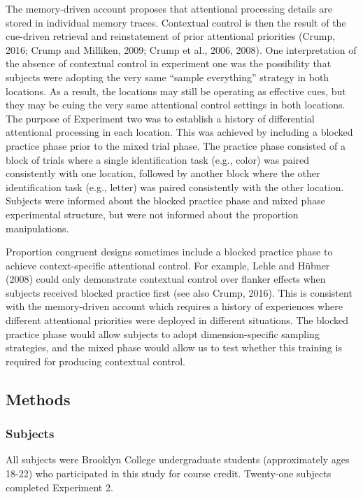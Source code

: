 \documentclass[]{DissertateCUNY}
\begin{document}
The memory-driven account proposes that attentional processing details
are stored in individual memory traces. Contextual control is then the
result of the cue-driven retrieval and reinstatement of prior
attentional priorities (Crump, 2016; Crump and Milliken, 2009; Crump et
al., 2006, 2008). One interpretation of the absence of contextual
control in experiment one was the possibility that subjects were
adopting the very same ``sample everything'' strategy in both locations.
As a result, the locations may still be operating as effective cues, but
they may be cuing the very same attentional control settings in both
locations. The purpose of Experiment two was to establish a history of
differential attentional processing in each location. This was achieved
by including a blocked practice phase prior to the mixed trial phase.
The practice phase consisted of a block of trials where a single
identification task (e.g., color) was paired consistently with one
location, followed by another block where the other identification task
(e.g., letter) was paired consistently with the other location. Subjects
were informed about the blocked practice phase and mixed phase
experimental structure, but were not informed about the proportion
manipulations.

Proportion congruent designs sometimes include a blocked practice phase
to achieve context-specific attentional control. For example, Lehle and
Hübner (2008) could only demonstrate contextual control over flanker
effects when subjects received blocked practice first (see also Crump,
2016). This is consistent with the memory-driven account which requires
a history of experiences where different attentional priorities were
deployed in different situations. The blocked practice phase would allow
subjects to adopt dimension-specific sampling strategies, and the mixed
phase would allow us to test whether this training is required for
producing contextual control.

\hypertarget{methods-1}{%
\subsection{Methods}\label{methods-1}}

\hypertarget{subjects-1}{%
\subsubsection{Subjects}\label{subjects-1}}

All subjects were Brooklyn College undergraduate students (approximately
ages 18-22) who participated in this study for course credit. Twenty-one
subjects completed Experiment 2.
\end{document}

